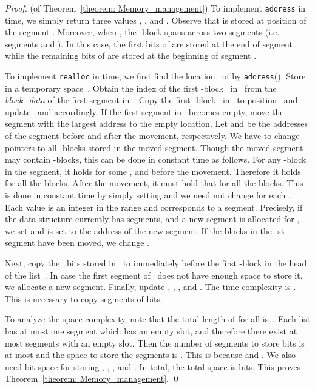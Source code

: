 \documentclass{llncs}
\begin{document}
\begin{proof} (of Theorem~\ref{theorem: Memory_management})
To implement \texttt{address} in  time, 
we simply return three values , , and .
Observe that  is stored at position  of the segment .
Moreover, when , the -block  spans
across two segments (i.e. segments  and ).
In this case, the first  bits of  are
stored at the end of segment  while
the remaining bits of  are stored
at the beginning of segment .

To implement \texttt{realloc} in  time, we first find the
location~ of  by \texttt{address}().
Store  in a temporary space~.
Obtain the index  of the first -block~ in~
from the \emph{block\_data} of the first segment in~.
Copy the first -block~ in~ to position~ and
update~ and  accordingly.
If the first segment in~ becomes empty, move the segment
with the largest address to the empty location.
Let  and  be the addresses of the segment before and after the movement,
respectively.
We have to change pointers to all -blocks 
stored in the moved segment.  Though the moved segment may contain 
-blocks, this can be done in constant time as follows.
For any -block  in the segment, it holds  for some
, and  before the movement.
Therefore it holds  for all the blocks.
After the movement, it must hold that  for all the blocks.
This is done in constant time by simply setting  
and we need not change  for each .
Each value  is an integer in the range  and corresponds to
a segment.  Precisely,  if the data structure currently has  segments, and
a new segment is allocated for , we set  and 
is set to the address of the new segment.  If the blocks in the -st segment
have been moved, we change .  

Next, copy the ~bits stored in~ to immediately before the first
-block in the head of the list~.
In case the first segment of~ does not have enough space to store
it, we allocate a new segment.
Finally, update , , , and .
The time complexity is .  This is necessary to copy
segments of  bits.

\medskip

To analyze the space complexity, note that the total length of  for
all  is~.
Each list  has at most one segment which has an empty slot, and therefore
there exist at most  segments with an empty slot.
Then the number of segments to store  bits is at most  and
the space to store the segments is 
.
This is  because 
and .
We also need  bit space 
for storing , , , and .
In total, the total space is
 bits.
This proves Theorem~\ref{theorem: Memory_management}.
\qed
\end{proof}
\end{document}

